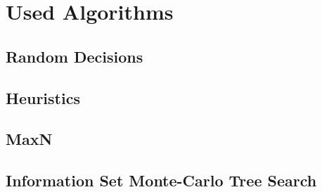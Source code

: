 \chapter{Used Algorithms}

\section{Random Decisions}

\section{Heuristics}

\section{MaxN}

\section{Information Set Monte-Carlo Tree Search}
